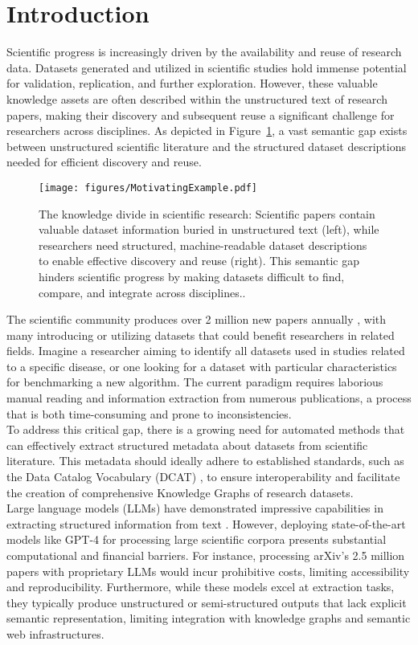 \documentclass[runningheads]{llncs}
\begin{document}
\section{Introduction}
Scientific progress is increasingly driven by the availability and reuse of research data. Datasets generated and utilized in scientific studies hold immense potential for validation, replication, and further exploration. However, these valuable knowledge assets are often described within the unstructured text of research papers, making their discovery and subsequent reuse a significant challenge for researchers across disciplines. As depicted in Figure~\ref{fig:motivation}, a vast semantic gap exists between unstructured scientific literature and the structured dataset descriptions needed for efficient discovery and reuse.
\begin{figure}[t!]
\centering
\texttt{[image: figures/MotivatingExample.pdf]}
\caption{The knowledge divide in scientific research: Scientific papers contain valuable dataset information buried in unstructured text (left), while researchers need structured, machine-readable dataset descriptions to enable effective discovery and reuse (right). This semantic gap hinders scientific progress by making datasets difficult to find, compare, and integrate across disciplines..}
\label{fig:motivation}
\end{figure}
\noindent
The scientific community produces over 2 million new papers annually \cite{ware2015stm}, with many introducing or utilizing datasets that could benefit researchers in related fields. Imagine a researcher aiming to identify all datasets used in studies related to a specific disease, or one looking for a dataset with particular characteristics for benchmarking a new algorithm. The current paradigm requires laborious manual reading and information extraction from numerous publications, a process that is both time-consuming and prone to inconsistencies.
\\
\noindent
To address this critical gap, there is a growing need for automated methods that can effectively extract structured metadata about datasets from scientific literature. This metadata should ideally adhere to established standards, such as the Data Catalog Vocabulary (DCAT) \cite{maali2014data}, to ensure interoperability and facilitate the creation of comprehensive Knowledge Graphs of research datasets.
\\
\noindent
Large language models (LLMs) have demonstrated impressive capabilities in extracting structured information from text \cite{wei2022chain}. However, deploying state-of-the-art models like GPT-4 \cite{openai2023gpt4} for processing large scientific corpora presents substantial computational and financial barriers. For instance, processing arXiv's 2.5 million papers with proprietary LLMs would incur prohibitive costs, limiting accessibility and reproducibility. Furthermore, while these models excel at extraction tasks, they typically produce unstructured or semi-structured outputs that lack explicit semantic representation, limiting integration with knowledge graphs and semantic web infrastructures.
\end{document}
